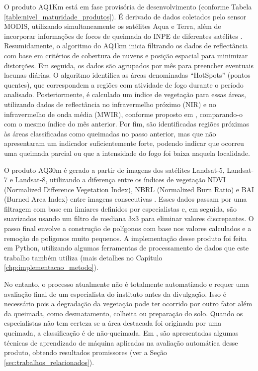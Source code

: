 \documentclass[cic,tc]{iiufrgs}
\begin{document}
O produto AQ1Km está em fase provisória de desenvolvimento (conforme Tabela \ref{table:nivel_maturidade_produtos}). É derivado de dados coletados pelo sensor MODIS, utilizando simultaneamente os satélites Aqua e Terra, além de incorporar informações de focos de queimada do INPE de diferentes satélites \citep{libonati2015algorithm}. Resumidamente, o algoritmo do AQ1km inicia filtrando os dados de reflectância com base em critérios de cobertura de nuvens e posição espacial para minimizar distorções. Em seguida, os dados são agrupados por mês para preencher eventuais lacunas diárias. O algoritmo identifica as áreas denominadas ``HotSpots'' (pontos quentes), que correspondem a regiões com atividade de fogo durante o período analisado. Posteriormente, é calculado um índice de vegetação para essas áreas, utilizando dados de reflectância no infravermelho próximo (NIR) e no infravermelho de onda média (MWIR), conforme proposto em \citet{libonati2011}, comparando-o com o mesmo índice do mês anterior. Por fim, são identificadas regiões próximas às áreas classificadas como queimadas no passo anterior, mas que não apresentaram um indicador suficientemente forte, podendo indicar que ocorreu uma queimada parcial ou que a intensidade do fogo foi baixa naquela localidade.

O produto AQ30m é gerado a partir de imagens dos satélites Landsat-5, Landsat-7 e Landsat-8, utilizando a diferença entre os índices de vegetação NDVI (Normalized Difference Vegetation Index), NBRL (Normalized Burn Ratio) e BAI (Burned Area Index) entre imagens consecutivas \citep{melchiori2014landsat}. Esses dados passam por uma filtragem com base em limiares definidos por especialistas e, em seguida, são suavizados usando um filtro de mediana 3x3 para eliminar valores discrepantes. O passo final envolve a construção de polígonos com base nos valores calculados e a remoção de polígonos muito pequenos. A implementação desse produto foi feita em Python, utilizando algumas ferramentas de processamento de dados que este trabalho também utiliza (mais detalhes no Capítulo \ref{chp:implementacao_metodo}). 

No entanto, o processo atualmente não é totalmente automatizado e requer uma avaliação final de um especialista do instituto antes da divulgação. Isso é necessário pois a degradação da vegetação pode ter ocorrido por outro fator além da queimada, como desmatamento, colheita ou preparação do solo. Quando os especialistas não tem certeza se a área destacada foi originada por uma queimada, a classificação é de não-queimada. Em \citet{dosclassificaccao}, são apresentadas algumas técnicas de aprendizado de máquina aplicadas na avaliação automática desse produto, obtendo resultados promissores (ver a Seção \ref{sec:trabalhos_relacionados}).
\end{document}
